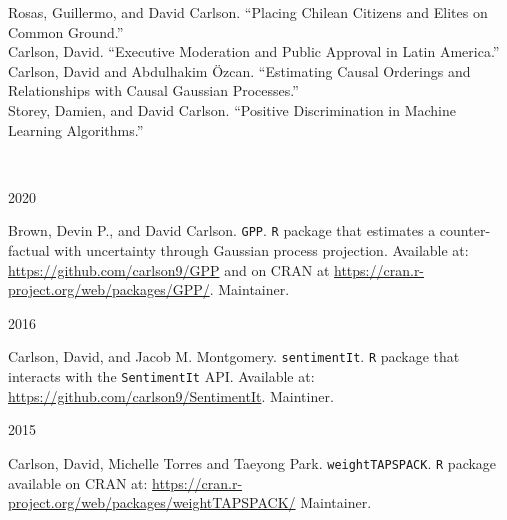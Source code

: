 \documentclass[12pt]{article}
\begin{document}
\FlushLeft
Rosas, Guillermo, and David Carlson. ``Placing Chilean Citizens and Elites on Common Ground.''\\

\FlushLeft
Carlson, David. ``Executive Moderation and Public Approval in Latin America.''\\

\FlushLeft
Carlson, David and Abdulhakim \"{O}zcan. ``Estimating Causal Orderings and Relationships with Causal Gaussian Processes.''\\

\FlushLeft
Storey, Damien, and David Carlson. ``Positive Discrimination in Machine Learning Algorithms.''\\
\pagebreak

\vspace{.75cm}
\\
\vspace{.2cm}

\begin{minipage}[t]{.15\textwidth}
2020\\
\end{minipage}
\begin{minipage}[t]{.8\textwidth}
\FlushLeft
Brown, Devin P., and David Carlson. \texttt{GPP}. \texttt{R} package that estimates a counter-factual with uncertainty through Gaussian process projection. Available at: \url{https://github.com/carlson9/GPP} and on CRAN at \url{https://cran.r-project.org/web/packages/GPP/}. Maintainer.\\
\end{minipage}
\vspace{.5cm}

\begin{minipage}[t]{.15\textwidth}
2016\\
\end{minipage}
\begin{minipage}[t]{.8\textwidth}
\FlushLeft
Carlson, David, and Jacob M. Montgomery. \texttt{sentimentIt}. \texttt{R} package that interacts with the \texttt{SentimentIt} API. Available at: \url{https://github.com/carlson9/SentimentIt}. Maintiner.\\
\end{minipage}
\vspace{.5cm}

\begin{minipage}[t]{.15\textwidth}
2015\\
\end{minipage}
\begin{minipage}[t]{.8\textwidth}
\FlushLeft
Carlson, David, Michelle Torres and Taeyong Park. \texttt{weightTAPSPACK}. \texttt{R} package available on CRAN at: \url{https://cran.r-project.org/web/packages/weightTAPSPACK/} Maintainer.\\
\end{minipage}
\end{document}
